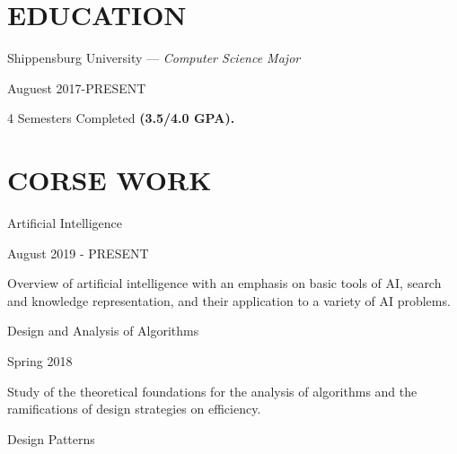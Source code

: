 \documentclass{article}
\newenvironment{heading} {
    \bfseries
    \normalsize
    \color{black}
    \setlength{\parskip}{1em}
    \renewcommand{\familydefault}{merriweather}
} {\par}
\newenvironment{subtext} {
    \footnotesize
    \color{Dark-Grey}
    \setlength{\parskip}{0.75em}
    \renewcommand{\familydefault}{opensans}
} {\par}
\newenvironment{ntext} {
    \small
    \color{Dark-Grey}
    \setlength{\parskip}{0.75em}
    \renewcommand{\familydefault}{merriweather}
} {\par}
\begin{document}
\begin{multicols}{2}

\section*{EDUCATION}

    \begin{heading}
        Shippensburg University \mdseries — \textit{Computer Science Major}
    \end{heading}

    \begin{subtext}
        Auguest 2017-PRESENT
    \end{subtext}

    \begin{ntext}
        4 Semesters Completed \textbf{(3.5/4.0 GPA).}
    \end{ntext}

\section*{CORSE WORK}

    \begin{heading}
        Artificial Intelligence
    \end{heading}

    \begin{subtext}
        August 2019 - PRESENT
    \end{subtext}

    \begin{ntext}
        Overview of artificial intelligence with an emphasis on basic tools of AI, search and knowledge representation, and their application to a variety of AI problems.
    \end{ntext}

    \begin{heading}
        Design and Analysis of Algorithms
    \end{heading}

    \begin{subtext}
        Spring 2018
    \end{subtext}

    \begin{ntext}
        Study of the theoretical foundations for the analysis of algorithms and the ramifications of design strategies on efficiency.
    \end{ntext}

    \begin{heading}
        Design Patterns
    \end{heading}


\end{multicols}
\end{document}
